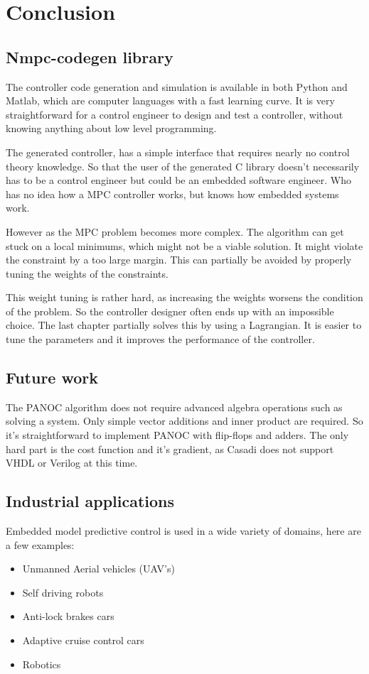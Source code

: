 \chapter{Conclusion}
\label{cha:conclusion}

\section{Nmpc-codegen library}
The controller code generation and simulation is available in both Python and Matlab, which are computer languages with a fast learning curve. It is very straightforward for a control engineer to design and test a controller, without knowing anything about low level programming.

The generated controller, has a simple interface that requires nearly no control theory knowledge. So that the user of the generated C library doesn't necessarily has to be a control engineer but could be an embedded software engineer. Who has no idea how a MPC controller works, but knows how embedded systems work.

However as the MPC problem becomes more complex. The algorithm can get stuck on a local minimums, which might not be a viable solution. It might violate the constraint by a too large margin. This can partially be avoided by properly tuning the weights of the constraints. 

This weight tuning is rather hard, as increasing the weights worsens the condition of the problem. So the controller designer often ends up with an impossible choice. The last chapter partially solves this by using a Lagrangian. It is easier to tune the parameters and it improves the performance of the controller. 

\section{Future work}
The PANOC algorithm does not require advanced algebra operations such as solving a system. Only simple vector additions and inner product are required. So it's straightforward to implement PANOC with flip-flops and adders. The only hard part is the cost function and it's gradient, as Casadi does not support VHDL or Verilog at this time.

\section{Industrial applications}
Embedded model predictive control is used in a wide variety of domains, here are a few examples:
\begin{itemize}
	\item Unmanned Aerial vehicles (UAV's)
	\item Self driving robots
	\item Anti-lock brakes cars
	\item Adaptive cruise control cars
	\item Robotics
\end{itemize}

